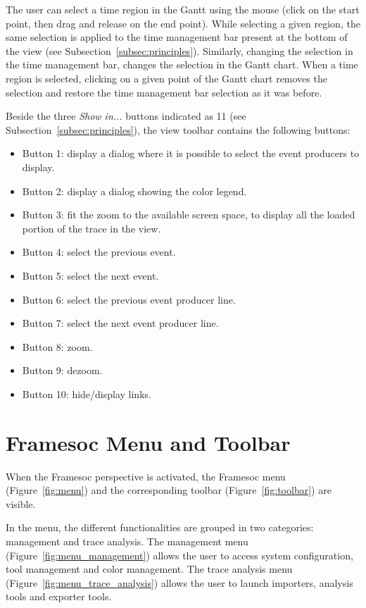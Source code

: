 \documentclass[twoside]{article}
\begin{document}
\begin{sloppypar}
The user can select a time region in the Gantt using the mouse (click on the start point, then drag and release on the end point). 
While selecting a given region, the same selection is applied to the time management bar present at the bottom of the view (see Subsection~\ref{subsec:principles}).
Similarly, changing the selection in the time management bar, changes the selection in the Gantt chart.
When a time region is selected, clicking on a given point of the Gantt chart removes the selection and restore the time management bar selection as it was before.

Beside the three \emph{Show in...} buttons indicated as \num{11} (see Subsection~\ref{subsec:principles}), the view toolbar contains the following buttons:
 \begin{itemize}
  \item Button \num{1}: display a dialog where it is possible to select the event producers to display.
  \item Button \num{2}: display a dialog showing the color legend. 
  \item Button \num{3}: fit the zoom to the available screen space, to display all the loaded portion of the trace in the view.
  \item Button \num{4}: select the previous event.
  \item Button \num{5}: select the next event.
  \item Button \num{6}: select the previous event producer line.
  \item Button \num{7}: select the next event producer line.
  \item Button \num{8}: zoom.
  \item Button \num{9}: dezoom.
  \item Button \num{10}: hide/display links.
 \end{itemize}

\section{Framesoc Menu and Toolbar}
\label{sec:menu}

When the Framesoc perspective is activated, the Framesoc menu (Figure~\ref{fig:menu}) and the corresponding toolbar (Figure~\ref{fig:toolbar}) are visible. 

In the menu, the different functionalities are grouped in two categories: management and trace analysis.
The management menu (Figure~\ref{fig:menu_management}) allows the user to access system configuration, tool management and color management.
The trace analysis menu (Figure~\ref{fig:menu_trace_analysis}) allows the user to launch importers, analysis tools and exporter tools.


\end{sloppypar}
\end{document}
